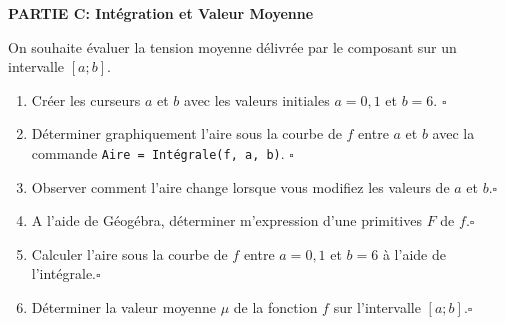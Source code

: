 \documentclass[a4paper,10pt]{report}
\begin{document}
\bigskip

\pagebreak
\thispagestyle{DS_LP}

\textbf{PARTIE C: Intégration et Valeur Moyenne}

\medskip


On souhaite évaluer la tension moyenne délivrée par le composant sur un intervalle $[a ; b]$.


\begin{enumerate}
    \item Créer les curseurs $a$ et $b$ avec les valeurs initiales $a=0,1$ et $b=6$. \hfill $\square$
    \item Déterminer graphiquement l'aire sous la courbe de $f$ entre $a$ et $b$ avec la commande \verb|Aire = Intégrale(f, a, b)|. \hfill $\square$
        
    \item Observer comment l'aire change lorsque vous modifiez les valeurs de $a$ et $b$.\hfill $\square$

    \item A l'aide de Géogébra, déterminer m'expression d'une primitives $F$ de $f$.\hfill $\square$

    \item Calculer l'aire sous la courbe de $f$ entre $a=0,1$ et $b=6$ à l'aide de l'intégrale.\hfill $\square$
    \item Déterminer la valeur moyenne $\mu$ de la fonction $f$ sur l'intervalle $[a ; b]$.\hfill $\square$
\end{enumerate}
\end{document}
